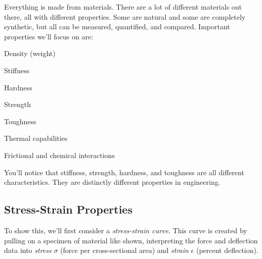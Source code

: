 \documentclass[10pt,letterpaper]{book}
\begin{document}
 Everything is made from materials. There are a lot of different materials out there, all with different properties. Some are natural and some are completely synthetic, but all can be measured, quantified, and compared. Important properties we'll focus on are:
 
 \begin{compactitem}
 	\item Density (weight)
 	\item Stiffness
 	\item Hardness
 	\item Strength
 	\item Toughness
 	\item Thermal capabilities
 	\item Frictional and chemical interactions
 \end{compactitem}
 
 You'll notice that stiffness, strength, hardness, and toughness are all different characteristics. They are distinctly different properties in engineering.
 
 \subsection{Stress-Strain Properties}
 
 To show this, we'll first consider a \textit{stress-strain curve}. This curve is created by pulling on a specimen of material like shown, interpreting the force and deflection data into \textit{stress} $\sigma$ (force per cross-sectional area) and \textit{strain} $\epsilon$ (percent deflection).
 
\end{document}
